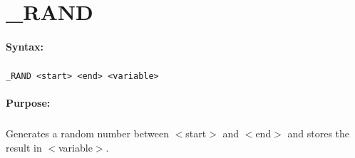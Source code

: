 
\newpage
\section{\_RAND}
\label{cmd:_RAND}

\paragraph{Syntax:}
\subparagraph{}
\texttt{\_RAND <start> <end> <variable>}

\paragraph{Purpose:}
\subparagraph{}
Generates a random number between $<$start$>$ and $<$end$>$ 
and stores the result in $<$variable$>$.